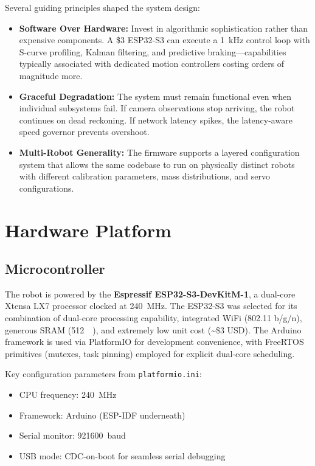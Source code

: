 \documentclass[12pt, a4paper, twoside]{article}
\begin{document}
Several guiding principles shaped the system design:

\begin{itemize}
    \item \textbf{Software Over Hardware:} Invest in algorithmic sophistication rather than expensive components. A \$3 ESP32-S3 can execute a \SI{1}{\kilo\hertz} control loop with S-curve profiling, Kalman filtering, and predictive braking---capabilities typically associated with dedicated motion controllers costing orders of magnitude more.

    \item \textbf{Graceful Degradation:} The system must remain functional even when individual subsystems fail. If camera observations stop arriving, the robot continues on dead reckoning. If network latency spikes, the latency-aware speed governor prevents overshoot.

    \item \textbf{Multi-Robot Generality:} The firmware supports a layered configuration system that allows the same codebase to run on physically distinct robots with different calibration parameters, mass distributions, and servo configurations.
\end{itemize}

\section{Hardware Platform}
\label{sec:hardware}

\subsection{Microcontroller}

The robot is powered by the \textbf{Espressif ESP32-S3-DevKitM-1}, a dual-core Xtensa LX7 processor clocked at \SI{240}{\mega\hertz}. The ESP32-S3 was selected for its combination of dual-core processing capability, integrated WiFi (802.11 b/g/n), generous SRAM (\SI{512}{\kilo\byte}), and extremely low unit cost (\textasciitilde\$3 USD). The Arduino framework is used via PlatformIO for development convenience, with FreeRTOS primitives (mutexes, task pinning) employed for explicit dual-core scheduling.

Key configuration parameters from \texttt{platformio.ini}:
\begin{itemize}
    \item CPU frequency: \SI{240}{\mega\hertz}
    \item Framework: Arduino (ESP-IDF underneath)
    \item Serial monitor: \SI{921600}{baud}
    \item USB mode: CDC-on-boot for seamless serial debugging
\end{itemize}
\end{document}
